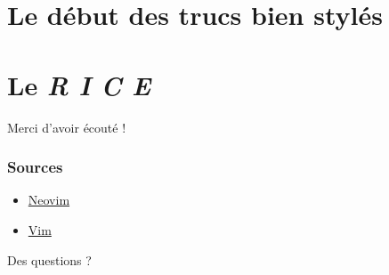 \documentclass[10pt]{beamer}
\begin{document}
		\section{Le début des trucs bien stylés}
		\section{Le \textit{R I C E}}

	\begin{appendix}

		\begin{frame}[standout]
			Merci d'avoir écouté !
		\end{frame}

		\begin{frame}
			\frametitle{Sources}
			\begin{itemize}
				\item \href{https://neovim.io/}{Neovim}
				\item \href{https://www.vim.org}{Vim}
			\end{itemize}
		\end{frame}

		\begin{frame}[standout]
			Des questions ?
		\end{frame}

	\end{appendix}
\end{document}
